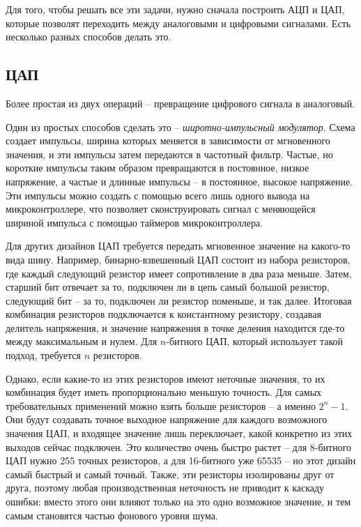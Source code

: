 \documentclass[a4page]{article}
\begin{document}
Для того, чтобы решать все эти задачи, нужно сначала построить АЦП и ЦАП, которые позволят переходить между аналоговыми и цифровыми сигналами.
Есть несколько разных способов делать это.

\subsection{ЦАП}
Более простая из двух операций -- превращение цифрового сигнала в аналоговый.

Один из простых способов сделать это -- \emph{широтно-импульсный модулятор}.
Схема создает импульсы, ширина которых меняется в зависимости от мгновенного значения,
и эти импульсы затем передаются в частотный фильтр.
Частые, но короткие импульсы таким образом превращаются в постоянное, низкое напряжение,
а частые и длинные импульсы -- в постоянное, высокое напряжение.
Эти импульсы можно создать с помощью всего лишь одного вывода на микроконтроллере,
что позволяет сконструировать сигнал с меняющейся шириной импульса с помощью таймеров микроконтроллера.

Для других дизайнов ЦАП требуется передать мгновенное значение на какого-то вида шину.
Например, бинарно-взвешенный ЦАП состоит из набора резисторов,
где каждый следующий резистор имеет сопротивление в два раза меньше.
Затем, старший бит отвечает за то, подключен ли в цепь самый большой резистор,
следующий бит -- за то, подключен ли резистор поменьше, и так далее.
Итоговая комбинация резисторов подключается к константному резистору, создавая делитель напряжения,
и значение напряжения в точке деления находится где-то между максимальным и нулем.
Для $n$-битного ЦАП, который использует такой подход,
требуется $n$ резисторов.

Однако, если какие-то из этих резисторов имеют неточные значения,
то их комбинация будет иметь пропорционально меньшую точность.
Для самых требова\-тельных применений можно взять больше резисторов -- а именно $2^n-1$.
Они будут создавать точное выходное напряжение для каждого возможного значения ЦАП,
и входящее значение лишь переключает, какой конкретно из этих выходов сейчас подключен.
Это количество очень быстро растет -- для 8-битного ЦАП нужно 255 точных резисторов,
а для 16-битного уже 65535 -- но этот дизайн самый быстрый и самый точный.
Также, эти резисторы изо\-лированы друг от друга, поэтому любая произ\-водственная неточность
не приводит к каскаду ошибки:
вместо этого они влияют только на это одно возможное значение,
и тем самым становятся частью фонового уровня шума.
\end{document}
